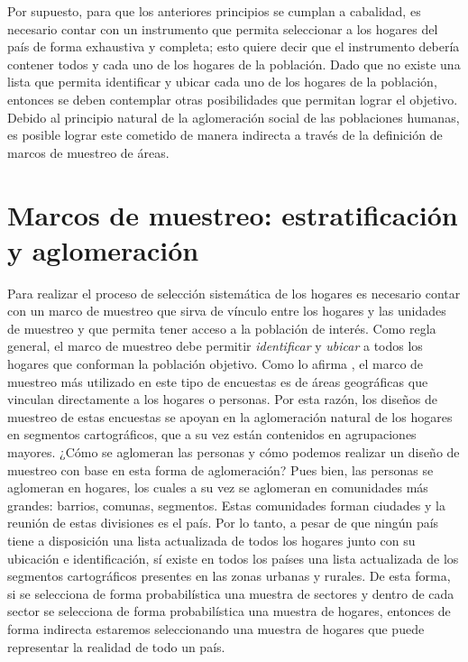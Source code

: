 \documentclass[12pt,spanish,]{book}
\begin{document}
Por supuesto, para que los anteriores principios se cumplan a cabalidad, es necesario contar con un instrumento que permita seleccionar a los hogares del país de forma exhaustiva y completa; esto quiere decir que el instrumento debería contener todos y cada uno de los hogares de la población. Dado que no existe una lista que permita identificar y ubicar cada uno de los hogares de la población, entonces se deben contemplar otras posibilidades que permitan lograr el objetivo. Debido al principio natural de la aglomeración social de las poblaciones humanas, es posible lograr este cometido de manera indirecta a través de la definición de marcos de muestreo de áreas.

\hypertarget{marcos-de-muestreo-estratificacion-y-aglomeracion}{%
\section{Marcos de muestreo: estratificación y aglomeración}\label{marcos-de-muestreo-estratificacion-y-aglomeracion}}

Para realizar el proceso de selección sistemática de los hogares es necesario contar con un marco de muestreo que sirva de vínculo entre los hogares y las unidades de muestreo y que permita tener acceso a la población de interés. Como regla general, el marco de muestreo debe permitir \emph{identificar} y \emph{ubicar} a todos los hogares que conforman la población objetivo. Como lo afirma \textcite{Gutierrez_2016}, el marco de muestreo más utilizado en este tipo de encuestas es de áreas geográficas que vinculan directamente a los hogares o personas. Por esta razón, los diseños de muestreo de estas encuestas se apoyan en la aglomeración natural de los hogares en segmentos cartográficos, que a su vez están contenidos en agrupaciones mayores. ¿Cómo se aglomeran las personas y cómo podemos realizar un diseño de muestreo con base en esta forma de aglomeración? Pues bien, las personas se aglomeran en hogares, los cuales a su vez se aglomeran en comunidades más grandes: barrios, comunas, segmentos. Estas comunidades forman ciudades y la reunión de estas divisiones es el país. Por lo tanto, a pesar de que ningún país tiene a disposición una lista actualizada de todos los hogares junto con su ubicación e identificación, sí existe en todos los países una lista actualizada de los segmentos cartográficos presentes en las zonas urbanas y rurales. De esta forma, si se selecciona de forma probabilística una muestra de sectores y dentro de cada sector se selecciona de forma probabilística una muestra de hogares, entonces de forma indirecta estaremos seleccionando una muestra de hogares que puede representar la realidad de todo un país.
\end{document}
